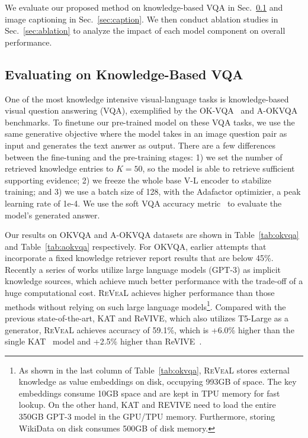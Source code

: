 \documentclass[10pt,twocolumn,letterpaper]{article}
\newcommand{\method}{R\textsc{e}V\textsc{ea}L\xspace}
\begin{document}
We evaluate our proposed method on knowledge-based VQA in Sec.~\ref{sec:vqa} and image captioning in Sec.~\ref{sec:caption}. We then conduct ablation studies in Sec.~\ref{sec:ablation} to analyze the impact of each model component on overall performance.


\subsection{Evaluating on Knowledge-Based VQA}\label{sec:vqa}
One of the most knowledge intensive visual-language tasks is knowledge-based visual question answering (VQA), exemplified by the OK-VQA~\cite{DBLP:conf/cvpr/MarinoRFM19} and A-OKVQA~\cite{DBLP:journals/corr/abs-2206-01718} benchmarks.
To finetune our pre-trained model on these VQA tasks, we use the same generative objective where the model takes in an image question pair as input and generates the text answer as output. There are a few differences between the fine-tuning and the pre-training stages: 1) we set the number of retrieved knowledge entries to $K=50$, so the model is able to retrieve sufficient supporting evidence; 2) we freeze the whole base V-L encoder to stabilize training; and 3) we use a batch size of 128, with the Adafactor optimizier, a peak learning rate of 1e-4. 
We use the soft VQA accuracy metric~\cite{DBLP:journals/corr/AntolALMBZP15} to evaluate the model's generated answer.

Our results on OKVQA and A-OKVQA datasets are shown in Table~\ref{tab:okvqa} and Table~\ref{tab:aokvqa} respectively. For OKVQA, earlier attempts that incorporate a fixed knowledge retriever report results that are below 45\%.  Recently a series of works utilize large language models (\eg GPT-3) as implicit knowledge sources, which achieve much better performance with the trade-off of a huge computational cost. \method achieves higher performance than those methods without relying on such large language models\footnote{As shown in the last column of Table~\ref{tab:okvqa}, \method stores external knowledge as value embeddings on disk, occupying 993GB of space. The key embeddings consume 10GB space and are kept in TPU memory for fast lookup. On the other hand, KAT and REVIVE need to load the entire 350GB GPT-3 model in the GPU/TPU memory. Furthermore, storing WikiData on disk consumes 500GB of disk memory.}. Compared with the previous state-of-the-art, KAT and ReVIVE, which also utilizes T5-Large as a generator, \method achieves accuracy of 59.1\%, which is +6.0\% higher than the single KAT~\cite{DBLP:conf/naacl/GuiWH0BG22} model and  +2.5\% higher than ReVIVE~\cite{DBLP:journals/corr/abs-2206-01201}.
\end{document}
